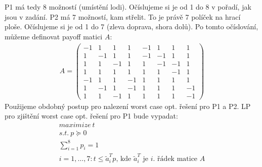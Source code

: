 \documentclass[12pt, a4paper]{article}
\begin{document}
\section{}
P1 má tedy 8 možností (umístění lodi). Očíslujeme si je od 1 do 8 v pořadí, jak jsou v zadání. P2 má 7 možností, kam střelit. To je právě 7 políček na hrací ploše. Očíslujeme si je od 1 do 7 (zleva doprava, shora dolů). Po tomto očíslování, můžeme definovat payoff matici $A$:
\begin{gather*}
A = \begin{pmatrix}
-1 & 1 & 1 & 1 & -1 & 1 & 1 & 1\\
1 & -1 & 1 & 1 & -1 & -1 & 1 & 1\\
1 & 1 & -1 & 1 & 1 & -1 & -1 & 1\\
1 & 1 & 1 & 1 & 1 & 1 & -1 & 1\\
-1 & 1 & 1 & -1 & 1 & 1 & 1 & 1\\
1 & -1 & 1 & -1 & 1 & 1 & 1 & -1\\
1 & 1 & -1 & 1 & 1 & 1 & 1 & -1
\end{pmatrix}
\end{gather*}
Použijeme obdobný postup pro nalezení worst case opt. řešení pro P1 a P2. LP pro zjištění worst case opt. řešení pro P1 bude vypadat:
\begin{gather*}
maximize \ t\\
s.t. \ p \succeq 0\\
\sum_{i=1}^8 p_i = 1\\
i=1,\dots, 7: t \leq \tilde{a}_i^T p \text{, kde }\tilde{a}_i^T \text{ je }i. \text{ řádek matice } A
\end{gather*}
\end{document}
